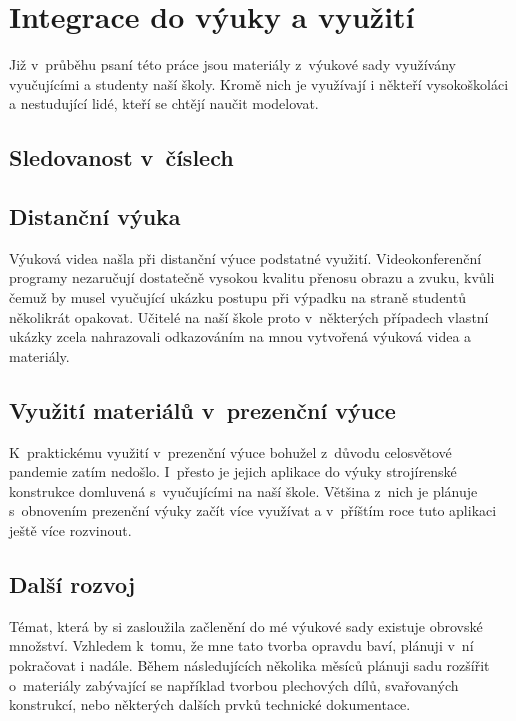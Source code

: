 \chapter{Integrace do výuky a využití}
Již v~průběhu psaní této práce jsou materiály z~výukové sady využívány vyučujícími a studenty naší školy.
Kromě nich je využívají i někteří vysokoškoláci a nestudující lidé, kteří se chtějí naučit modelovat.

\section{Sledovanost v~číslech}
\B{\textcolor{mygreen}{PŠ: Tuto sekci bych rád vztáhnul ke konkrétnímu datu a zmínil konkrétní čísla. Rád bych počkal ještě nějakou chvíli, mezitím by se sledovanost měla přehoupnout přes ty dva tisíce. TZN napíšu nejpozději ve středu večer... }\normalsize}

\section{Distanční výuka}
Výuková videa našla při distanční výuce podstatné využití.
Videokonferenční programy nezaručují dostatečně vysokou kvalitu přenosu obrazu a zvuku, kvůli čemuž by musel vyučující ukázku postupu při výpadku na straně studentů několikrát opakovat.
Učitelé na naší škole proto v~některých případech vlastní ukázky zcela nahrazovali odkazováním na mnou vytvořená výuková videa a materiály.

\section{Využití materiálů v~prezenční výuce}
K~praktickému využití v~prezenční výuce bohužel z~důvodu celosvětové pandemie zatím nedošlo. 
I~přesto je jejich aplikace do výuky strojírenské konstrukce domluvená s~vyučujícími na naší škole.
Většina z~nich je plánuje s~obnovením prezenční výuky začít více využívat a v~příštím roce tuto aplikaci ještě více rozvinout.

\section{Další rozvoj}
\B{\textcolor{mygreen}{PŠ: Možná odsunout do závěru?}}\newline
Témat, která by si zasloužila začlenění do mé výukové sady existuje obrovské množství.
Vzhledem k~tomu, že mne tato tvorba opravdu baví, plánuji v~ní pokračovat i nadále.
Během následujících několika měsíců plánuji sadu rozšířit o~materiály zabývající se například tvorbou plechových dílů, svařovaných konstrukcí, nebo některých dalších prvků technické dokumentace.
